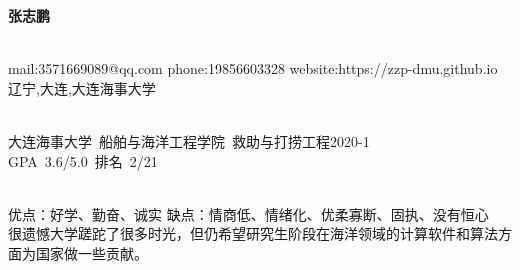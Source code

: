 \documentclass{ctexart}
\begin{document}
\pagestyle{empty}
\begin{center}
    \LARGE \textbf{张志鹏}
\end{center}
\begin{center}
\hrulefill \\
mail:3571669089@qq.com \qquad  phone:19856603328 \qquad website:https://zzp-dmu.github.io \\
辽宁,大连,大连海事大学 \\
\end{center} 
\vspace{0.1in}

 
\begin{center}
    \hrulefill \\
    \mbox{大连海事大学 \qquad 船舶与海洋工程学院 \qquad 救助与打捞工程2020-1 } \\
    \mbox{GPA 3.6/5.0 \quad 排名 2/21} 
\end{center}

\begin{flushleft}
    \hrulefill \\
    \textbullet 优点：好学、勤奋、诚实 \qquad \textbullet 缺点：情商低、情绪化、优柔寡断、固执、没有恒心\\
    很遗憾大学蹉跎了很多时光，但仍希望研究生阶段在海洋领域的计算软件和算法方面为国家做一些贡献。\\
\end{flushleft}
\end{document}
